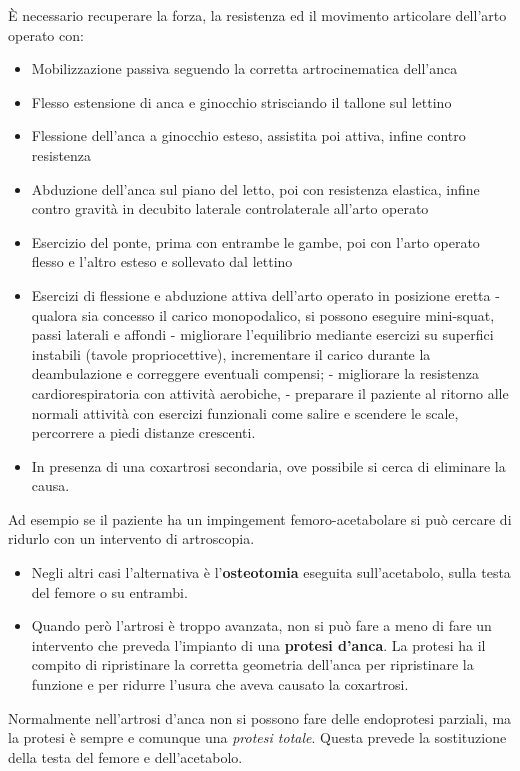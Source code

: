 È necessario recuperare la forza, la resistenza ed il movimento articolare dell'arto operato con:
\begin{itemize}
\item Mobilizzazione passiva seguendo la corretta artrocinematica dell'anca
\item Flesso estensione di anca e ginocchio strisciando il tallone sul lettino
\item Flessione dell'anca a ginocchio esteso, assistita poi attiva, infine contro resistenza
\item Abduzione dell'anca sul piano del letto, poi con resistenza elastica, infine contro gravità in decubito laterale controlaterale all'arto operato
\item Esercizio del ponte, prima con entrambe le gambe, poi con l'arto operato flesso e l'altro esteso e sollevato dal lettino
\item Esercizi di flessione e abduzione attiva dell'arto operato in posizione eretta - qualora sia concesso il carico monopodalico, si possono eseguire mini-squat, passi laterali e affondi - migliorare l'equilibrio mediante esercizi su superfici instabili (tavole propriocettive), incrementare il carico durante la deambulazione e correggere eventuali compensi; - migliorare la resistenza
cardiorespiratoria con attività aerobiche, - preparare il paziente al ritorno alle normali attività con esercizi funzionali come salire e scendere le scale, percorrere a piedi distanze crescenti.
\item
  In presenza di una coxartrosi secondaria, ove possibile si cerca di eliminare la causa.
\end{itemize}

Ad esempio se il paziente ha un impingement femoro-acetabolare si può cercare di ridurlo con un intervento di artroscopia.

\begin{itemize}
\item
  Negli altri casi l'alternativa è l'\textbf{osteotomia} eseguita sull'acetabolo, sulla testa del femore o su entrambi.
\item
  Quando però l'artrosi è troppo avanzata, non si può fare a meno di fare un intervento che preveda l'impianto di una \textbf{protesi d'anca}. La protesi ha il compito di ripristinare la corretta geometria dell'anca per ripristinare la funzione e per ridurre l'usura che aveva causato la coxartrosi.
\end{itemize}

Normalmente nell'artrosi d'anca non si possono fare delle endoprotesi parziali, ma la protesi è sempre e comunque una \emph{protesi totale}.
Questa prevede la sostituzione della testa del femore e dell'acetabolo.

